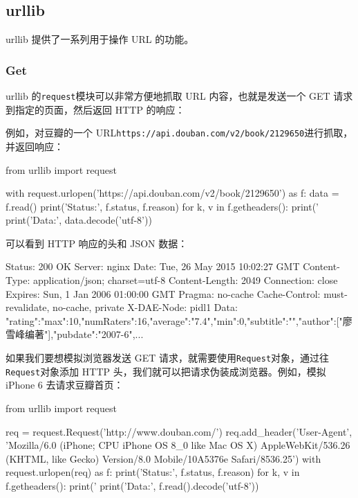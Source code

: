 \hypertarget{urllib}{%
\subsection{urllib}\label{urllib}}

urllib 提供了一系列用于操作 URL 的功能。

\hypertarget{get}{%
\subsubsection{Get}\label{get}}

urllib 的\texttt{request}模块可以非常方便地抓取 URL 内容，也就是发送一个
GET 请求到指定的页面，然后返回 HTTP 的响应：

例如，对豆瓣的一个
URL\texttt{https://api.douban.com/v2/book/2129650}进行抓取，并返回响应：

\begin{pythoncode}
from urllib import request

with request.urlopen('https://api.douban.com/v2/book/2129650') as f:
    data = f.read()
    print('Status:', f.status, f.reason)
    for k, v in f.getheaders():
        print('%
    print('Data:', data.decode('utf-8'))
\end{pythoncode}

可以看到 HTTP 响应的头和 JSON 数据：

\begin{pythoncode}
Status: 200 OK
Server: nginx
Date: Tue, 26 May 2015 10:02:27 GMT
Content-Type: application/json; charset=utf-8
Content-Length: 2049
Connection: close
Expires: Sun, 1 Jan 2006 01:00:00 GMT
Pragma: no-cache
Cache-Control: must-revalidate, no-cache, private
X-DAE-Node: pidl1
Data: {"rating":{"max":10,"numRaters":16,"average":"7.4","min":0},"subtitle":"","author":["廖雪峰编著"],"pubdate":"2007-6",...}
\end{pythoncode}

如果我们要想模拟浏览器发送 GET
请求，就需要使用\texttt{Request}对象，通过往\texttt{Request}对象添加
HTTP 头，我们就可以把请求伪装成浏览器。例如，模拟 iPhone 6
去请求豆瓣首页：

\begin{pythoncode}
from urllib import request

req = request.Request('http://www.douban.com/')
req.add_header('User-Agent', 'Mozilla/6.0 (iPhone; CPU iPhone OS 8_0 like Mac OS X) AppleWebKit/536.26 (KHTML, like Gecko) Version/8.0 Mobile/10A5376e Safari/8536.25')
with request.urlopen(req) as f:
    print('Status:', f.status, f.reason)
    for k, v in f.getheaders():
        print('%
    print('Data:', f.read().decode('utf-8'))
\end{pythoncode}

